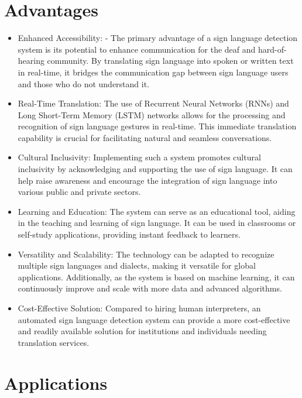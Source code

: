 \newpage
\section{Advantages}

\begin{itemize}
    \item Enhanced Accessibility:
   - The primary advantage of a sign language detection system is its potential to enhance communication for the deaf and hard-of-hearing community. By translating sign language into spoken or written text in real-time, it bridges the communication gap between sign language users and those who do not understand it.

    \item Real-Time Translation:
   The use of Recurrent Neural Networks (RNNs) and Long Short-Term Memory (LSTM) networks allows for the processing and recognition of sign language gestures in real-time. This immediate translation capability is crucial for facilitating natural and seamless conversations.

    \item  Cultural Inclusivity:
   Implementing such a system promotes cultural inclusivity by acknowledging and supporting the use of sign language. It can help raise awareness and encourage the integration of sign language into various public and private sectors.


    \item Learning and Education:
   The system can serve as an educational tool, aiding in the teaching and learning of sign language. It can be used in classrooms or self-study applications, providing instant feedback to learners.
   \item Versatility and Scalability:
   The technology can be adapted to recognize multiple sign languages and dialects, making it versatile for global applications. Additionally, as the system is based on machine learning, it can continuously improve and scale with more data and advanced algorithms.

   \item Cost-Effective Solution:
   Compared to hiring human interpreters, an automated sign language detection system can provide a more cost-effective and readily available solution for institutions and individuals needing translation services.

    \end{itemize}
    
\section{Applications}

